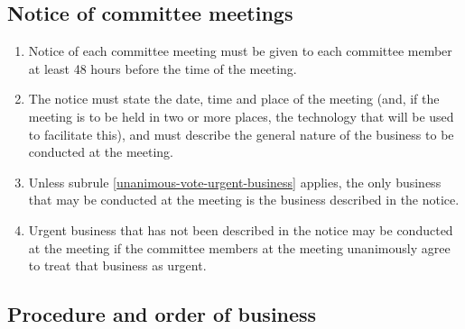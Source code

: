 \documentclass[../constitution.tex]{subfiles}
\begin{document}
\hypertarget{notice-of-committee-meetings}{%
\subsection{Notice of committee meetings}\label{notice-of-committee-meetings}}

\begin{enumerate}

\item Notice of each committee meeting must be given to each committee member at least 48 hours before the time of the meeting.
\item The notice must state the date, time and place of the meeting (and, if the meeting is to be held in two or more places, the technology that will be used to facilitate this), and must describe the general nature of the business to be conducted at the meeting.
\item Unless subrule \ref{unanimous-vote-urgent-business} applies, the only business that may be conducted at the meeting is the business described in the notice.
\item Urgent business that has not been described in the notice may be conducted at the meeting if the committee members at the meeting unanimously agree to treat that business as urgent. \label{unanimous-vote-urgent-business}
\end{enumerate}

\hypertarget{procedure-and-order-of-business}{%
\subsection{Procedure and order of business}\label{procedure-and-order-of-business}}
\end{document}
